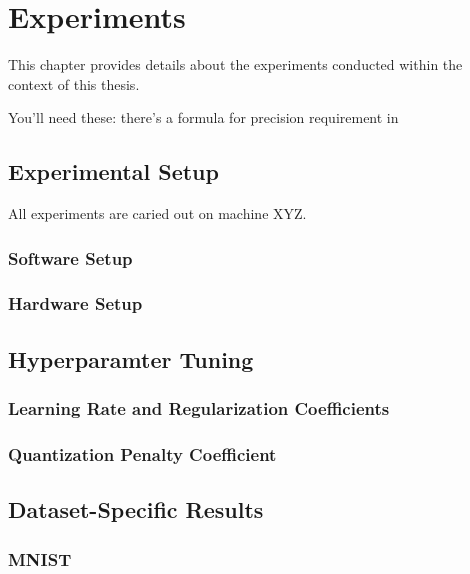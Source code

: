 \chapter{Experiments\label{cha:chapter4}}
This chapter provides details about the experiments conducted within the context of this thesis. 

You'll need these:
there's a formula for precision requirement in \cite{soroosh2018adaptive}

\section{Experimental Setup}
\label{sec:setup}
All experiments are caried out on machine XYZ. 

\subsection{Software Setup}
\label{subsec:softwaresetup}

\subsection{Hardware Setup}
\label{subsec:softwaresetup}


\section{Hyperparamter Tuning}
\label{sec:hyperparameter}

\subsection{Learning Rate and Regularization Coefficients}
\label{subsec:learning rate}

\subsection{Quantization Penalty Coefficient}
\label{subsec:penalty rate}

\section{Dataset-Specific Results}
\label{sec:dataset}

\subsection{MNIST}
\label{subsec:mnist}

